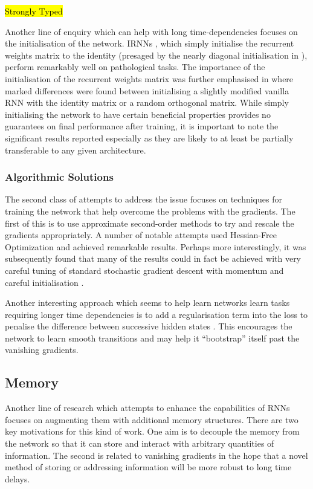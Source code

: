 \hl{Strongly Typed}

Another line of enquiry which can help with long time-dependencies focuses on the initialisation
of the network. IRNNs \autocite{Le2015}, which simply initialise the recurrent weights matrix to the
 identity (presaged by the nearly diagonal initialisation in \autocite{Mikolov2015}), perform
remarkably well on pathological tasks. The importance of the initialisation of the recurrent weights
matrix was further emphasised in \autocite{Henaff2016} where marked differences were found between
initialising a slightly modified vanilla RNN with the identity matrix or a random orthogonal matrix.
While simply initialising the network to have certain beneficial properties provides no guarantees
on final performance after training, it is important to note the significant results reported
especially as they are likely to at least be partially transferable to any given architecture.

\subsubsection{Algorithmic Solutions}
The second class of attempts to address the issue focuses on techniques for training the network
that help overcome the problems with the gradients. The first of this is to use approximate
second-order methods to try and rescale the gradients appropriately. A number of notable attempts
used Hessian-Free Optimization \autocite{Martens2011, Boulanger-Lewandowski2012} and achieved
remarkable results. Perhaps more interestingly, it was subsequently found that many of the results
could in fact be achieved with very careful tuning of standard stochastic gradient descent with
momentum and careful initialisation \autocite{Sutskever2013a}.

Another interesting approach which seems to help learn networks learn tasks requiring longer time
dependencies is to add a regularisation term into the loss to penalise the difference between
successive hidden states \autocite{Krueger2016}. This encourages the network to learn smooth
transitions and may help it ``bootstrap'' itself past the vanishing gradients.


\subsection{Memory}
Another line of research which attempts to enhance the capabilities of RNNs focuses on augmenting
them with additional memory structures. There are two key motivations for this kind of work. 
One aim is to decouple the memory from the network so that it can store and interact with arbitrary
quantities of information. The second is related to vanishing gradients in the hope that a novel
method of storing or addressing information will be more robust to long time delays.

